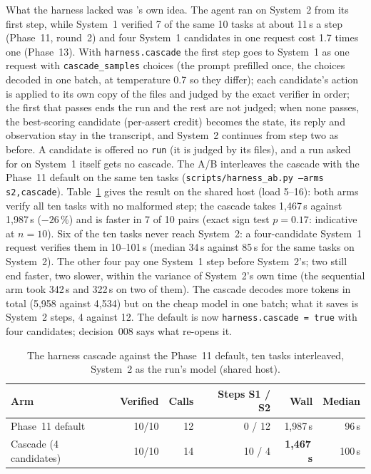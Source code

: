 What the harness lacked was \Sys{}'s own idea. The agent ran on System~2 from its first step, while System~1 verified 7 of the
same 10 tasks at about 11\,s a step (Phase~11, round~2) and four System~1 candidates in one request cost 1.7 times one
(Phase~13). With \texttt{harness.cascade} the first step goes to System~1 as one request with \texttt{cascade\_samples} choices
(the prompt prefilled once, the choices decoded in one batch, at temperature 0.7 so they differ); each candidate's action is
applied to its own copy of the files and judged by the exact verifier in order; the first that passes ends the run and the rest
are not judged; when none passes, the best-scoring candidate (per-assert credit) becomes the state, its reply and observation
stay in the transcript, and System~2 continues from step two as before. A candidate is offered no \texttt{run} (it is judged by
its files), and a run asked for on System~1 itself gets no cascade. The A/B interleaves the cascade with the Phase~11 default on
the same ten tasks (\texttt{scripts/harness\_ab.py --arms s2,cascade}).
Table~\ref{tab:p14-cascade} gives the result on the shared host (load 5--16): both arms verify all ten tasks with no malformed
step; the cascade takes 1,467\,s against 1,987\,s ($-26\,\%$) and is faster in 7 of 10 pairs (exact sign test $p=0.17$:
indicative at $n=10$). Six of the ten tasks never reach System~2: a four-candidate System~1 request verifies them in 10--101\,s
(median 34\,s against 85\,s for the same tasks on System~2). The other four pay one System~1 step before System~2's; two still
end faster, two slower, within the variance of System~2's own time (the sequential arm took 342\,s and 322\,s on two of them).
The cascade decodes more tokens in total (5,958 against 4,534) but on the cheap model in one batch; what it saves is System~2
steps, 4 against 12. The default is now \texttt{harness.cascade = true} with four candidates; decision~008 says what re-opens it.

\begin{table}[t]
\centering
\caption{The harness cascade against the Phase~11 default, ten tasks interleaved, System~2 as the run's model (shared host).}
\label{tab:p14-cascade}
\scriptsize
\begin{tabular}{@{}lrrrrr@{}}
\toprule
Arm & Verified & Calls & Steps S1 / S2 & Wall & Median \\
\midrule
Phase~11 default & 10/10 & 12 & 0 / 12 & 1,987\,s & 96\,s \\
Cascade (4 candidates) & 10/10 & 14 & 10 / 4 & \textbf{1,467\,s} & 100\,s \\
\bottomrule
\end{tabular}
\end{table}

